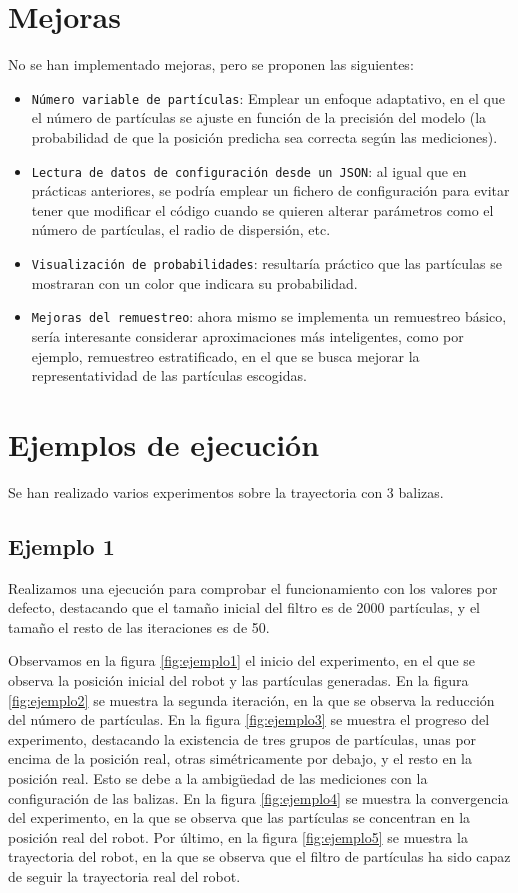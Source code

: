 \section{Mejoras}
No se han implementado mejoras, pero se proponen las siguientes:
\begin{itemize}
  \item \texttt{Número variable de partículas}: Emplear un enfoque adaptativo, en el que el número de partículas se ajuste en función
de la precisión del modelo (la probabilidad de que la posición predicha sea correcta según las mediciones).
  \item \texttt{Lectura de datos de configuración desde un JSON}: al igual que en prácticas anteriores, se podría emplear un fichero de configuración para evitar tener
que modificar el código cuando se quieren alterar parámetros como el número de partículas, el radio de dispersión, etc.
\item \texttt{Visualización de probabilidades}: resultaría práctico que las partículas se mostraran con un color que indicara su probabilidad.
  \item \texttt{Mejoras del remuestreo}: ahora mismo se implementa un remuestreo básico, sería interesante considerar aproximaciones más inteligentes, como 
por ejemplo, remuestreo estratificado, en el que se busca mejorar la representatividad de las partículas escogidas.
\end{itemize}

\section{Ejemplos de ejecución}
Se han realizado varios experimentos sobre la trayectoria con 3 balizas.
\subsection{Ejemplo 1}

Realizamos una ejecución para comprobar el funcionamiento con los valores por defecto, destacando que el tamaño inicial del filtro es de 2000 partículas, y el tamaño el resto de las iteraciones es de 50.

Observamos en la figura \ref{fig:ejemplo1} el inicio del experimento, en el que se observa la posición inicial del robot y las partículas generadas. En la figura \ref{fig:ejemplo2} se muestra la segunda iteración, en la que se observa la reducción del número de partículas.
En la figura \ref{fig:ejemplo3} se muestra el progreso del experimento, destacando la existencia de tres grupos de partículas, unas por encima de la posición real, otras simétricamente por debajo, y el resto en la posición real. Esto se debe a la ambigüedad de las mediciones con la configuración de las balizas.
En la figura \ref{fig:ejemplo4} se muestra la convergencia del experimento, en la que se observa que las partículas se concentran en la posición real del robot. Por último, en la figura \ref{fig:ejemplo5} se muestra la trayectoria del robot, en la que se observa que el filtro de partículas ha sido capaz de seguir la trayectoria real del robot.

